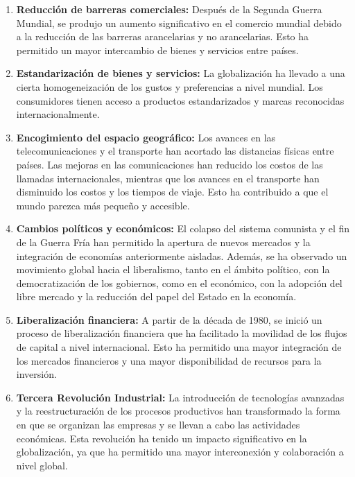 \documentclass[
  a4paper,
]{article}
\begin{document}
\begin{enumerate}
\def\labelenumi{\arabic{enumi}.}
\item
  \textbf{Reducción de barreras comerciales:} Después de la Segunda
  Guerra Mundial, se produjo un aumento significativo en el comercio
  mundial debido a la reducción de las barreras arancelarias y no
  arancelarias. Esto ha permitido un mayor intercambio de bienes y
  servicios entre países.
\item
  \textbf{Estandarización de bienes y servicios:} La globalización ha
  llevado a una cierta homogeneización de los gustos y preferencias a
  nivel mundial. Los consumidores tienen acceso a productos
  estandarizados y marcas reconocidas internacionalmente.
\item
  \textbf{Encogimiento del espacio geográfico:} Los avances en las
  telecomunicaciones y el transporte han acortado las distancias físicas
  entre países. Las mejoras en las comunicaciones han reducido los
  costos de las llamadas internacionales, mientras que los avances en el
  transporte han disminuido los costos y los tiempos de viaje. Esto ha
  contribuido a que el mundo parezca más pequeño y accesible.
\item
  \textbf{Cambios políticos y económicos:} El colapso del sistema
  comunista y el fin de la Guerra Fría han permitido la apertura de
  nuevos mercados y la integración de economías anteriormente aisladas.
  Además, se ha observado un movimiento global hacia el liberalismo,
  tanto en el ámbito político, con la democratización de los gobiernos,
  como en el económico, con la adopción del libre mercado y la reducción
  del papel del Estado en la economía.
\item
  \textbf{Liberalización financiera:} A partir de la década de 1980, se
  inició un proceso de liberalización financiera que ha facilitado la
  movilidad de los flujos de capital a nivel internacional. Esto ha
  permitido una mayor integración de los mercados financieros y una
  mayor disponibilidad de recursos para la inversión.
\item
  \textbf{Tercera Revolución Industrial:} La introducción de tecnologías
  avanzadas y la reestructuración de los procesos productivos han
  transformado la forma en que se organizan las empresas y se llevan a
  cabo las actividades económicas. Esta revolución ha tenido un impacto
  significativo en la globalización, ya que ha permitido una mayor
  interconexión y colaboración a nivel global.
\end{enumerate}
\end{document}
